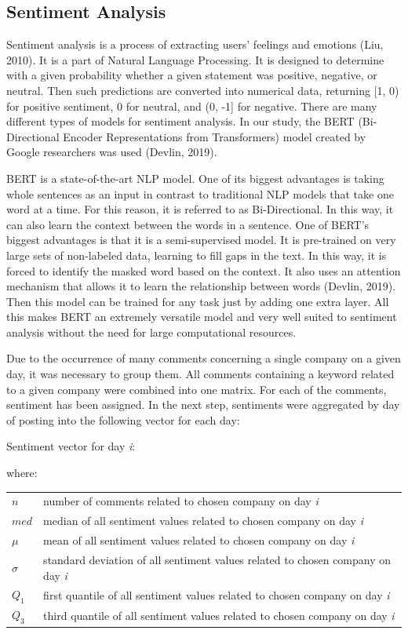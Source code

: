 \documentclass[11pt]{article} %
\makeatletter
\newenvironment{conditions}
  {\par\vspace{\abovedisplayskip}\noindent\begin{tabular}{>{$}l<{$} @{${}={}$} l}}
  {\end{tabular}\par\vspace{\belowdisplayskip}}
\makeatother
\begin{document}
\subsection{Sentiment Analysis}
Sentiment analysis is a process of extracting users' feelings and emotions (Liu, 2010). It is a part of Natural Language Processing. It is designed to determine with a given probability whether a given statement was positive, negative, or neutral. Then such predictions are converted into numerical data, returning [1, 0) for positive sentiment, 0 for neutral, and (0, -1] for negative. There are many different types of models for sentiment analysis. In our study, the BERT (Bi-Directional Encoder Representations from Transformers) model created by Google researchers was used (Devlin, 2019). 

BERT is a state-of-the-art NLP model. One of its biggest advantages is taking whole sentences as an input in contrast to traditional NLP models that take one word at a time. For this reason, it is referred to as Bi-Directional. In this way, it can also learn the context between the words in a sentence. One of BERT's biggest advantages is that it is a semi-supervised model. It is pre-trained on very large sets of non-labeled data, learning to fill gaps in the text. In this way, it is forced to identify the masked word based on the context. It also uses an attention mechanism that allows it to learn the relationship between words (Devlin, 2019). Then this model can be trained for any task just by adding one extra layer.  All this makes BERT an extremely versatile model and very well suited to sentiment analysis without the need for large computational resources. 


Due to the occurrence of many comments concerning a single company on a given day, it was necessary to group them. All comments containing a keyword related to a given company were combined into one matrix. For each of the comments, sentiment has been assigned. In the next step, sentiments were aggregated by day of posting into the following vector for each day: 
\begin{center}   Sentiment vector for day \emph{i}:\end{center}
\begin{equation} [n, \mu, \sigma, med, Q_1, Q_3] \end{equation}
where:
\begin{conditions}
 n     &  number of comments related to chosen company on day \emph{i}\\
 med     &  median of all sentiment values related to chosen company on day \emph{i} \\  
\mu    &  mean of all sentiment values related to chosen company on day \emph{i} \\    
\sigma    &  standard deviation of all sentiment values related to chosen company on day \emph{i} \\   
Q_1     &  first quantile of all sentiment values related to chosen company on day \emph{i} \\   
Q_3     &  third quantile of all sentiment values related to chosen company on day \emph{i} \\   
\end{conditions}
\end{document}
